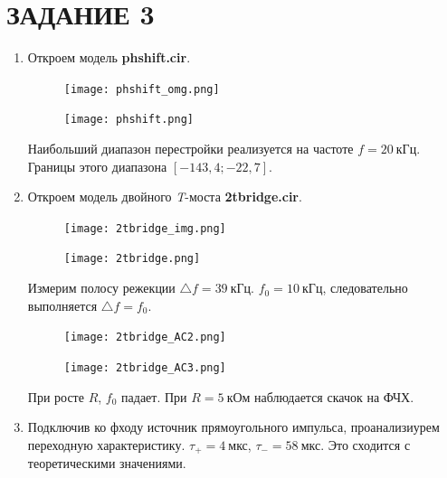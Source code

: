 \documentclass[a4paper, 12pt]{article}%
\begin{document}
\section*{ЗАДАНИЕ 3}

\begin{enumerate}

\item Откроем модель \textbf{phshift.cir}.

\begin{figure}[h!]
\centering
\texttt{[image: phshift\_omg.png]}
\label{fig:Image1}
\end{figure}

\begin{figure}[h!]
\centering
\texttt{[image: phshift.png]}
\label{fig:Image1}
\end{figure}

Наибольший диапазон перестройки реализуется на частоте $f = 20  \: \textit{кГц}$. Границы этого диапазона $[-143,4; -22,7]$.

\item Откроем модель двойного \textit{T}-моста \textbf{2tbridge.cir}.

\begin{figure}[h!]
\centering
\texttt{[image: 2tbridge\_img.png]}
\label{fig:Image1}
\end{figure}

\begin{figure}[h!]
\centering
\texttt{[image: 2tbridge.png]}
\label{fig:Image1}
\end{figure}

Измерим полосу режекции $\triangle f = 39 \: \textit{кГц}$. $f_0 = 10 \: \textit{кГц}$, следовательно выполняется $\triangle f = f_0$.

\begin{figure}[h!]
\centering
\texttt{[image: 2tbridge\_AC2.png]}
\label{fig:Image1}
\end{figure}

\begin{figure}[h!]
\centering
\texttt{[image: 2tbridge\_AC3.png]}
\label{fig:Image1}
\end{figure}

При росте $R$, $f_0$ падает. При $R = 5 \: \textit{кОм}$ наблюдается скачок на ФЧХ.

\item Подключив ко фходу источник прямоугольного импульса, проанализиурем переходную характеристику. $\tau_+ = 4 \: \textit{мкс}$, $\tau_- = 58 \: \textit{мкс}$. Это сходится с теоретическими значениями.


\end{enumerate}
\end{document}

